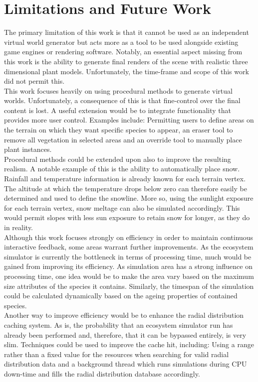 \section{Limitations and Future Work} \label{sec:future_work}

The primary limitation of this work is that it cannot be used as an independent virtual world generator but acts more as a tool to be used alongside existing game engines or rendering software. Notably, an essential aspect missing from this work is the ability to generate final renders of the scene with realistic three dimensional plant models. Unfortunately, the time-frame and scope of this work did not permit this.\\

This work focuses heavily on using procedural methods to generate virtual worlds. Unfortunately, a consequence of this is that fine-control over the final content is lost. A useful extension would be to integrate functionality that provides more user control. Examples include: Permitting users to define areas on the terrain on which they want specific species to appear, an eraser tool to remove all vegetation in selected areas and an override tool to manually place plant instances.\\

Procedural methods could be extended upon also to improve the resulting realism. A notable example of this is the ability to automatically place snow. Rainfall and temperature information is already known for each terrain vertex. The altitude at which the temperature drops below zero can therefore easily be determined and used to define the snowline. More so, using the sunlight exposure for each terrain vertex, snow meltage can also be simulated accordingly. This would permit slopes with less sun exposure to retain snow for longer, as they do in reality. \\

Although this work focuses strongly on efficiency in order to maintain continuous interactive feedback, some areas warrant further improvements. As the ecosystem simulator is currently the bottleneck in terms of processing time, much would be gained from improving its efficiency. As simulation area has a strong influence on processing time, one idea would be to make the area vary based on the maximum size attributes of the species it contains. Similarly, the timespan of the simulation could be calculated dynamically based on the ageing properties of contained species. \\
Another way to improve efficiency would be to enhance the radial distribution caching system. As is, the probability that an ecosystem simulator run has already been performed and, therefore, that it can be bypassed entirely, is very slim. Techniques could be used to improve the cache hit, including: Using a range rather than a fixed value for the resources when searching for valid radial distribution data and a background thread which runs simulations during CPU down-time and fills the radial distribution database accordingly.\\

